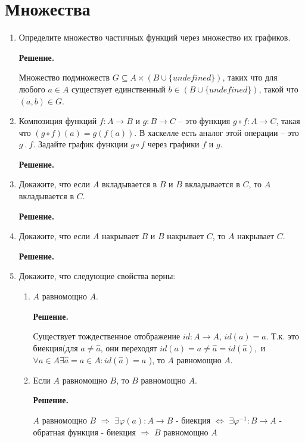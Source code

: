 \section*{Множества}
\begin{enumerate}

\item Определите множество частичных функций через множество их графиков.

\textbf{Решение.} 

Множество подмножеств $G \subseteq A \times (B \cup \{undefined\})$,
таких что для любого $a \in A$ существует единственный
$b \in (B \cup \{undefined\})$, такой что $(a, b) \in G$.

\item Композиция функций $f : A \to B$ и $g : B \to C$ -- это функция $g \circ f : A \to C$, 
такая что $(g \circ f)(a) = g(f(a))$.
    В хаскелле есть аналог этой операции -- это $g\ .\ f$.
    Задайте график функции $g \circ f$ через графики $f$ и $g$.

\textbf{Решение.} 


\item Докажите, что если $A$ вкладывается в $B$ и $B$ вкладывается в $C$, то $A$ вкладывается в $C$.

\textbf{Решение.} 


\item Докажите, что если $A$ накрывает $B$ и $B$ накрывает $C$, то $A$ накрывает $C$.

\textbf{Решение.} 

\item Докажите, что следующие свойства верны:
\begin{enumerate}
\item $A$ равномощно $A$.

\textbf{Решение.} 

Существует тождественное отображение $id: A\rightarrow A$, $id(a) = a$. Т.к. это биекция(для 
$a\neq \hat{a}$, они переходят $id(a) = a \neq \hat{a} = id(\hat{a}),$ и $\forall a\in A 
\exists\hat{a} = a \in A : id(\hat{a}) = a$ ), то $A$ равномощно $A$. 

\item Если $A$ равномощно $B$, то $B$ равномощно $A$.

\textbf{Решение.} 

$A$ равномощно $B$ $\Rightarrow$ $\exists \varphi(a):A\rightarrow B$ - биекция 
$\Leftrightarrow$ $\exists \varphi^{-1} : B \rightarrow A$ - обратная функция - биекция 
$\Rightarrow$ $B$ равномощно $A$ 



\end{enumerate}
\end{enumerate}
